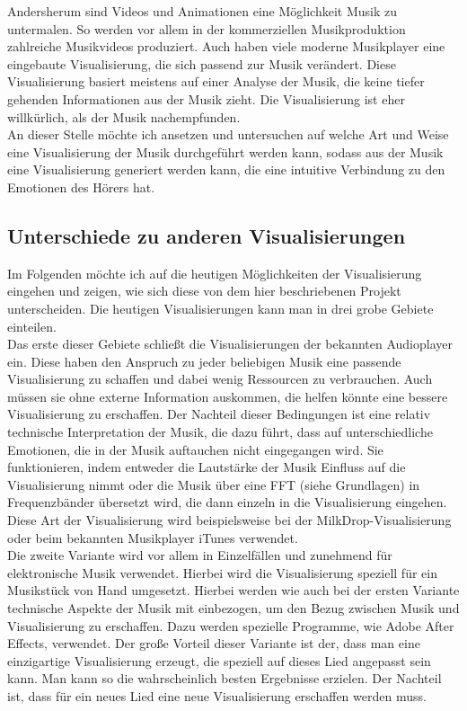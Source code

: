 \documentclass[11pt,a4paper]{article}
\begin{document}
Andersherum sind Videos und Animationen eine Möglichkeit Musik zu untermalen. So werden vor allem in der kommerziellen Musikproduktion zahlreiche Musikvideos produziert. Auch haben viele moderne Musikplayer eine eingebaute Visualisierung, die sich passend zur Musik verändert. Diese Visualisierung basiert meistens auf einer Analyse der Musik, die keine tiefer gehenden Informationen aus der Musik zieht. Die Visualisierung ist eher willkürlich, als der Musik nachempfunden.\\
An dieser Stelle möchte ich ansetzen und untersuchen auf welche Art und Weise eine Visualisierung der Musik durchgeführt werden kann, sodass aus der Musik eine Visualisierung generiert werden kann, die eine intuitive Verbindung zu den Emotionen des Hörers hat.

\subsection{Unterschiede zu anderen Visualisierungen}
Im Folgenden möchte ich auf die heutigen Möglichkeiten der Visualisierung eingehen und zeigen, wie sich diese von dem hier beschriebenen Projekt unterscheiden. Die heutigen Visualisierungen kann man in drei grobe Gebiete einteilen.\\
Das erste dieser Gebiete schließt die Visualisierungen der bekannten Audioplayer ein. Diese haben den Anspruch zu jeder beliebigen Musik eine passende Visualisierung zu schaffen und dabei wenig Ressourcen zu verbrauchen. Auch müssen sie ohne externe Information auskommen, die helfen könnte eine bessere Visualisierung zu erschaffen. Der Nachteil dieser Bedingungen ist eine relativ technische Interpretation der Musik, die dazu führt, dass auf unterschiedliche Emotionen, die in der Musik auftauchen nicht eingegangen wird. Sie funktionieren, indem entweder die Lautstärke der Musik Einfluss auf die Visualisierung nimmt oder die Musik über eine FFT (siehe Grundlagen) in Frequenzbänder übersetzt wird, die dann einzeln in die Visualisierung eingehen. Diese Art der Visualisierung wird beispielsweise bei der MilkDrop-Visualisierung oder beim bekannten Musikplayer iTunes verwendet.\\
Die zweite Variante wird vor allem in Einzelfällen und zunehmend für elektronische Musik verwendet. Hierbei wird die Visualisierung speziell für ein Musikstück von Hand umgesetzt. Hierbei werden wie auch bei der ersten Variante technische Aspekte der Musik mit einbezogen, um den Bezug zwischen Musik und Visualisierung zu erschaffen. Dazu werden spezielle Programme, wie Adobe After Effects, verwendet. Der große Vorteil dieser Variante ist der, dass man eine einzigartige Visualisierung erzeugt, die speziell auf dieses Lied angepasst sein kann. Man kann so die wahrscheinlich besten Ergebnisse erzielen. Der Nachteil ist, dass für ein neues Lied eine neue Visualisierung erschaffen werden muss.\\
\end{document}
